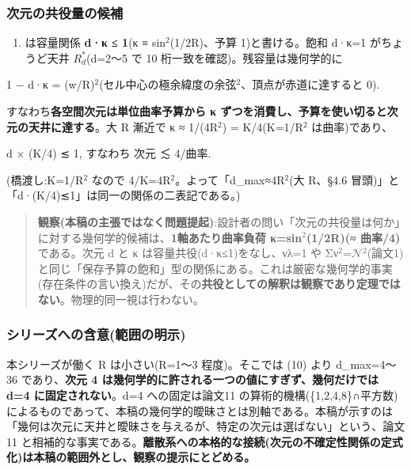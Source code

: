 \documentclass[
]{ltjsarticle}
\providecommand{\tightlist}{%
  \setlength{\itemsep}{0pt}\setlength{\parskip}{0pt}}
\begin{document}
\subsubsection{次元の共役量の候補}\label{ux6b21ux5143ux306eux5171ux5f79ux91cfux306eux5019ux88dc}

\begin{enumerate}
\def\labelenumi{(\arabic{enumi})}
\setcounter{enumi}{9}
\tightlist
\item
  は容量関係 \textbf{d·κ ≤ 1}(κ ≡ sin\(^{2}\)(1/2R)、予算
  1)と書ける。飽和 d·κ=1 がちょうど天井 \(R^{*}_{d}\)(d=2〜5 で 10
  桁一致を確認)。残容量は幾何学的に
\end{enumerate}

1 − d·κ =
(w/R)\(^{2}\)(セル中心の極余緯度の余弦\(^{2}\)、頂点が赤道に達すると 0).

すなわち\textbf{各空間次元は単位曲率予算から κ
ずつを消費し、予算を使い切ると次元の天井に達する}。大 R 漸近で κ ≈
1/(4R\(^{2}\)) = K/4(K=1/R\(^{2}\) は曲率)であり、

d × (K/4) ≲ 1, すなわち 次元 ≲ 4/曲率.

(橋渡し:K=1/R\(^{2}\) なので
4/K=4R\(^{2}\)。よって「d\_max≈4R\(^{2}\)(大 R、§4.6
冒頭)」と「d·(K/4)≲1」は同一の関係の二表記である。)

\begin{quote}
\textbf{観察(本稿の主張ではなく問題提起)}:設計者の問い「次元の共役量は何か」に対する幾何学的候補は、\textbf{1軸あたり曲率負荷
κ=sin\(^{2}\)(1/2R)(≈ 曲率/4)} である。次元 d と κ
は容量共役(d·κ≤1)をなし、νλ=1 や
Σν\(^{2}\)=\(\mathcal{N}\)\(^{2}\)(論文1)と同じ「保存予算の飽和」型の関係にある。これは厳密な幾何学的事実(存在条件の言い換え)だが、その\textbf{共役としての解釈は観察であり定理ではない}。物理的同一視は行わない。
\end{quote}

\subsubsection{シリーズへの含意(範囲の明示)}\label{ux30b7ux30eaux30fcux30baux3078ux306eux542bux610fux7bc4ux56f2ux306eux660eux793a}

本シリーズが働く R は小さい(R=1〜3 程度)。そこでは (10) より
d\_max=4〜36 であり、\textbf{次元 4
は幾何学的に許される一つの値にすぎず、幾何だけでは d=4
に固定されない}。d=4 への固定は論文11
の算術的機構(\{1,2,4,8\}∩平方数)によるものであって、本稿の幾何学的曖昧さとは別軸である。本稿が示すのは「幾何は次元に天井と曖昧さを与えるが、特定の次元は選ばない」という、論文11
と相補的な事実である。\textbf{離散系への本格的な接続(次元の不確定性関係の定式化)は本稿の範囲外とし、観察の提示にとどめる。}
\end{document}

